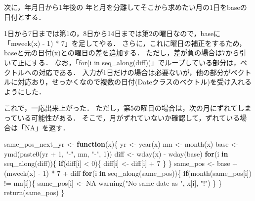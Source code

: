 \documentclass[
]{article}
\newenvironment{Shaded}{\begin{snugshade}}{\end{snugshade}}
\newcommand{\ConstantTok}[1]{\textcolor[rgb]{0.00,0.00,0.00}{#1}}
\newcommand{\ControlFlowTok}[1]{\textcolor[rgb]{0.13,0.29,0.53}{\textbf{#1}}}
\newcommand{\DecValTok}[1]{\textcolor[rgb]{0.00,0.00,0.81}{#1}}
\newcommand{\FunctionTok}[1]{\textcolor[rgb]{0.00,0.00,0.00}{#1}}
\newcommand{\NormalTok}[1]{#1}
\newcommand{\OtherTok}[1]{\textcolor[rgb]{0.56,0.35,0.01}{#1}}
\newcommand{\SpecialCharTok}[1]{\textcolor[rgb]{0.00,0.00,0.00}{#1}}
\newcommand{\StringTok}[1]{\textcolor[rgb]{0.31,0.60,0.02}{#1}}
\begin{document}
次に，年月日から1年後の
年と月を分離してそこから求めたい月の1日をbaseの日付とする．

1日から7日までは第1の，8日から14日までは第2の曜日なので，baseに「mweek(x) - 1) * 7」を足してやる．
さらに，これに曜日の補正をするため，baseと元の日付(x)との曜日の差を追加する．
ただし，差が負の場合は7から引いて正にする．
なお，「for(i in seq\_along(diff))」でループしている部分は，ベクトルへの対応である．
入力が1日だけの場合は必要ないが，他の部分がベクトルに対応おり，せっかくなので複数の日付(Dateクラスのベクトル)を受け入れるようにした．

これで，一応出来上がった．
ただし，第5の曜日の場合は，次の月にずれてしまっている可能性がある．
そこで，月がずれていないか確認して，ずれている場合は「NA」を返す．

\begin{Shaded}
\begin{Highlighting}[]
\NormalTok{same\_pos\_next\_yr }\OtherTok{\textless{}{-}} \ControlFlowTok{function}\NormalTok{(x)\{}
\NormalTok{  yr }\OtherTok{\textless{}{-}} \FunctionTok{year}\NormalTok{(x)}
\NormalTok{  mn }\OtherTok{\textless{}{-}} \FunctionTok{month}\NormalTok{(x)}
\NormalTok{  base }\OtherTok{\textless{}{-}} \FunctionTok{ymd}\NormalTok{(}\FunctionTok{paste0}\NormalTok{(yr }\SpecialCharTok{+} \DecValTok{1}\NormalTok{, }\StringTok{"{-}"}\NormalTok{, mn, }\StringTok{"{-}"}\NormalTok{, }\DecValTok{1}\NormalTok{))}
\NormalTok{  diff }\OtherTok{\textless{}{-}} \FunctionTok{wday}\NormalTok{(x) }\SpecialCharTok{{-}} \FunctionTok{wday}\NormalTok{(base)}
  \ControlFlowTok{for}\NormalTok{(i }\ControlFlowTok{in} \FunctionTok{seq\_along}\NormalTok{(diff))\{}
    \ControlFlowTok{if}\NormalTok{(diff[i] }\SpecialCharTok{\textless{}} \DecValTok{0}\NormalTok{)\{ diff[i] }\OtherTok{\textless{}{-}}\NormalTok{ diff[i] }\SpecialCharTok{+} \DecValTok{7}\NormalTok{ \}}
\NormalTok{  \}}
\NormalTok{  same\_pos }\OtherTok{\textless{}{-}}\NormalTok{ base }\SpecialCharTok{+}\NormalTok{ (}\FunctionTok{mweek}\NormalTok{(x) }\SpecialCharTok{{-}} \DecValTok{1}\NormalTok{) }\SpecialCharTok{*} \DecValTok{7} \SpecialCharTok{+}\NormalTok{ diff}
  \ControlFlowTok{for}\NormalTok{(i }\ControlFlowTok{in} \FunctionTok{seq\_along}\NormalTok{(same\_pos))\{}
    \ControlFlowTok{if}\NormalTok{(}\FunctionTok{month}\NormalTok{(same\_pos[i]) }\SpecialCharTok{!=}\NormalTok{ mn[i])\{}
\NormalTok{      same\_pos[i] }\OtherTok{\textless{}{-}} \ConstantTok{NA}
      \FunctionTok{warning}\NormalTok{(}\StringTok{"No same date as "}\NormalTok{, x[i], }\StringTok{"!"}\NormalTok{)}
\NormalTok{    \}}
\NormalTok{  \}}
  \FunctionTok{return}\NormalTok{(same\_pos)}
\NormalTok{\}}
\end{Highlighting}
\end{Shaded}
\end{document}
